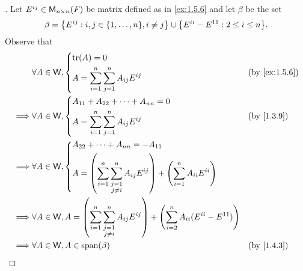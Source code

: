 \begin{proof}[]
  Let \(E^{i j} \in \mathsf{M}_{{n} \times n}({\mathit{F}})\) be matrix defined as in \cref{ex:1.5.6} and let \(\beta\) be the set
  \[
    \beta = \set{E^{i j} : i, j \in \set{1, \dots, n}, i \neq j} \cup \set{E^{i i} - E^{1 1} : 2 \leq i \leq n}.
  \]
  Observe that
  \begin{align*}
             & \forall A \in \W, \begin{dcases}
                                   \tr[A] = 0 \\
                                   A = \sum_{i = 1}^n \sum_{j = 1}^n A_{i j} E^{i j}
                                 \end{dcases}                                                                                                                                                                         &  & \text{(by \cref{ex:1.5.6})}                 \\
    \implies & \forall A \in \W, \begin{dcases}
                                   A_{1 1} + A_{2 2} + \cdots + A_{n n} = 0 \\
                                   A = \sum_{i = 1}^n \sum_{j = 1}^n A_{i j} E^{i j}
                                 \end{dcases}                                                                                                                                                                         &  & \text{(by \cref{1.3.9})}                    \\
    \implies & \forall A \in \W, \begin{dcases}
                                   A_{2 2} + \cdots + A_{n n} = -A_{1 1}        \\
                                   A = \pa{\sum_{i = 1}^n \sum_{\substack{j = 1 \\ j \neq i}}^n A_{i j} E^{i j}} + \pa{\sum_{i = 1}^n A_{i i} E^{i i}}
                                 \end{dcases}              \\
    \implies & \forall A \in \W, A = \pa{\sum_{i = 1}^n \sum_{\substack{j = 1                                                                                                                                                                                          \\ j \neq i}}^n A_{i j} E^{i j}} + \pa{\sum_{i = 2}^n A_{i i} (E^{i i} - E^{1 1})} \\
    \implies & \forall A \in \W, A \in \spn{\beta}                                                                                                                                                                                       &  & \text{(by \cref{1.4.3})} \\

\end{align*}
\end{proof}
